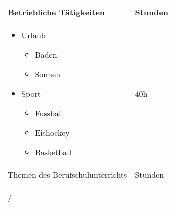 \begin{center}
	\begin{tabular}{ | p{30em}  | m{6em} | }
	\hline
	\rowcolor{Gray}
	Betriebliche T\"{a}tigkeiten & Stunden \\ \hline
	\begin{itemize}
	\item Urlaub
		\begin{itemize}
		\item Baden
		\item Sonnen
		\end{itemize}
	\item Sport
		\begin{itemize}
		\item Fussball
		\item Eishockey
		\item Basketball
		\end{itemize}
	\end{itemize} & \begin{center} 40h \end{center} \\ \hline
	\rowcolor{Gray}
	Themen des Berufschulunterrichts & Stunden \\ \hline
	\begin{center} / \end{center} & \begin{center}  \end{center} \\ \hline
	\end{tabular}
\end{center}